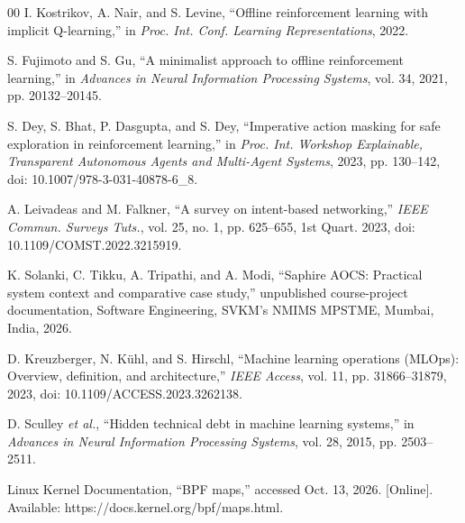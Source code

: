 \documentclass[conference]{IEEEtran}
\begin{document}
\begin{thebibliography}{00}
I. Kostrikov, A. Nair, and S. Levine, ``Offline reinforcement learning with implicit Q-learning,'' in \emph{Proc. Int. Conf. Learning Representations}, 2022.

S. Fujimoto and S. Gu, ``A minimalist approach to offline reinforcement learning,'' in \emph{Advances in Neural Information Processing Systems}, vol. 34, 2021, pp. 20132--20145.

S. Dey, S. Bhat, P. Dasgupta, and S. Dey, ``Imperative action masking for safe exploration in reinforcement learning,'' in \emph{Proc. Int. Workshop Explainable, Transparent Autonomous Agents and Multi-Agent Systems}, 2023, pp. 130--142, doi: 10.1007/978-3-031-40878-6\_8.

A. Leivadeas and M. Falkner, ``A survey on intent-based networking,'' \emph{IEEE Commun. Surveys Tuts.}, vol. 25, no. 1, pp. 625--655, 1st Quart. 2023, doi: 10.1109/COMST.2022.3215919.

K. Solanki, C. Tikku, A. Tripathi, and A. Modi, ``Saphire AOCS: Practical system context and comparative case study,'' unpublished course-project documentation, Software Engineering, SVKM's NMIMS MPSTME, Mumbai, India, 2026.

D. Kreuzberger, N. K\"uhl, and S. Hirschl, ``Machine learning operations (MLOps): Overview, definition, and architecture,'' \emph{IEEE Access}, vol. 11, pp. 31866--31879, 2023, doi: 10.1109/ACCESS.2023.3262138.

D. Sculley \emph{et al.}, ``Hidden technical debt in machine learning systems,'' in \emph{Advances in Neural Information Processing Systems}, vol. 28, 2015, pp. 2503--2511.

Linux Kernel Documentation, ``BPF maps,'' accessed Oct. 13, 2026. [Online]. Available: https://docs.kernel.org/bpf/maps.html.

\end{thebibliography}
\end{document}
